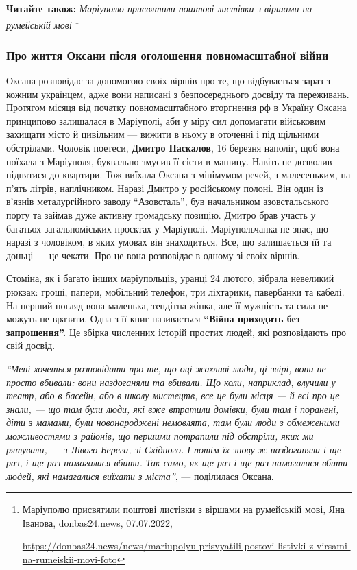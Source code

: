 \textbf{Читайте також:} \emph{Маріуполю присвятили поштові листівки з віршами на румейській мові}%
\footnote{Маріуполю присвятили поштові листівки з віршами на румейській мові, Яна Іванова, donbas24.news, 07.07.2022, \par%
\url{https://donbas24.news/news/mariupolyu-prisvyatili-postovi-listivki-z-virsami-na-rumeiskii-movi-foto}%
}

\subsubsection{Про життя Оксани після оголошення повномасштабної війни}

Оксана розповідає за допомогою своїх віршів про те, що відбувається зараз з
кожним українцем, адже вони написані з безпосереднього досвіду та переживань.
Протягом місяця від початку повномасштабного вторгнення рф в Україну Оксана
принципово залишалася в Маріуполі, аби у міру сил допомагати військовим
захищати місто й цивільним — вижити в ньому в оточенні і під щільними
обстрілами. Чоловік поетеси, \textbf{Дмитро Паскалов}, 16 березня наполіг, щоб
вона поїхала з Маріуполя, буквально змусив її сісти в машину. Навіть не
дозволив піднятися до квартири. Тож виїхала Оксана з мінімумом речей, з
малесеньким, на п'ять літрів, наплічником. Наразі Дмитро у російському полоні.
Він один із в'язнів металургійного заводу \enquote{Азовсталь}, був начальником
азовстальського порту та займав дуже активну громадську позицію. Дмитро брав
участь у багатьох загальноміських проєктах у Маріуполі. Маріупольчанка не знає,
що наразі з чоловіком, в яких умовах він знаходиться. Все, що залишається їй та
доньці — це чекати. Про це вона розповідає в одному зі своїх віршів.


Стоміна, як і багато інших маріупольців, уранці 24 лютого, зібрала невеликий
рюкзак: гроші, папери, мобільний телефон, три ліхтарики, павербанки та кабелі.
На перший погляд вона маленька, тендітна жінка, але її мужність та сила не
можуть не вразити. Одна з її книг називається \textbf{\enquote{Війна приходить без запрошення}.}
Це збірка численних історій простих людей, які розповідають про свій досвід. 

\begin{leftbar}
\emph{\enquote{Мені хочеться розповідати про те, що оці жахливі люди, ці звірі, вони не
просто вбивали: вони наздоганяли та вбивали. Що коли, наприклад,
влучили у театр, або в басейн, або в школу мистецтв, все це були місця
— й всі про це знали, — що там були люди, які вже втратили домівки,
були там і поранені, діти з мамами, були новонароджені немовлята, там
були люди з обмеженими можливостями з районів, що першими потрапили під
обстріли, яких ми рятували, — з Лівого Берега, зі Східного. І потім їх
знову ж наздоганяли і ще раз, і ще раз намагалися вбити. Так само, як
ще раз і ще раз намагалися вбити людей, які намагалися виїхати з
міста}}, — поділилася Оксана.
\end{leftbar}

